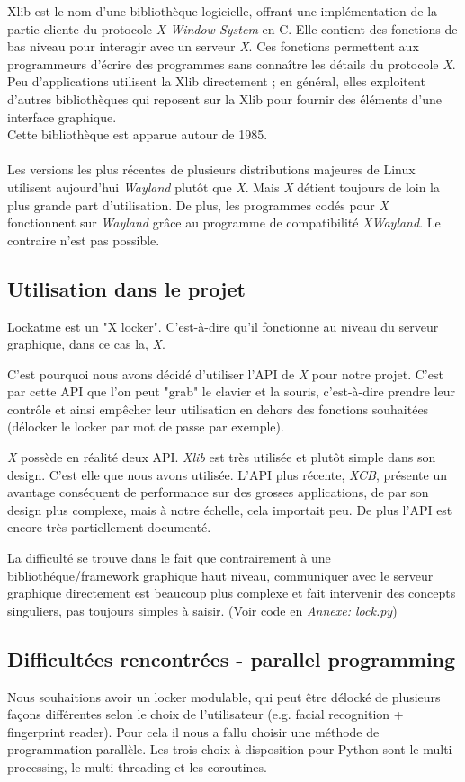 \documentclass[french]{report}
\begin{document}
Xlib est le nom d'une bibliothèque logicielle, offrant une implémentation de la
partie cliente du protocole \emph{X Window System} en C. Elle contient des fonctions
de bas niveau pour interagir avec un serveur \emph{X}. Ces fonctions permettent aux
programmeurs d'écrire des programmes sans connaître les détails du protocole \emph{X}.
Peu d'applications utilisent la Xlib directement ; en général, elles exploitent
d'autres bibliothèques qui reposent sur la Xlib pour fournir des éléments
d'une interface graphique.\\
Cette bibliothèque est apparue autour de 1985.\\\\
Les versions les plus récentes de plusieurs distributions majeures de Linux utilisent
aujourd'hui \emph{Wayland} plutôt que \emph{X}. Mais \emph{X} détient toujours de loin la plus
grande part d'utilisation. De plus, les programmes codés pour \emph{X} fonctionnent
sur \emph{Wayland} grâce au programme de compatibilité \emph{XWayland}. Le contraire n'est pas
possible.

\subsection{Utilisation dans le projet}

Lockatme est un "X locker". C'est-à-dire qu'il fonctionne au niveau du serveur graphique,
dans ce cas la, \emph{X}.

C'est pourquoi nous avons décidé d'utiliser l'API de \emph{X} pour notre projet. C'est par
cette API que l'on peut "grab" le clavier et la souris, c'est-à-dire prendre leur contrôle
et ainsi empêcher leur utilisation en dehors des fonctions souhaitées (délocker le
locker par mot de passe par exemple).

\emph{X} possède en réalité deux API. \emph{Xlib} est très utilisée et plutôt
simple dans son design.
C'est elle que nous avons utilisée. L'API plus récente, \emph{XCB}, présente un
avantage conséquent de performance sur des grosses applications, de par son design
plus complexe, mais à notre échelle, cela importait peu. De plus l'API est encore
très partiellement documenté.

La difficulté se trouve dans le fait que contrairement à une bibliothéque/framework
graphique haut niveau, communiquer avec le serveur graphique directement est
beaucoup plus complexe et fait intervenir des concepts singuliers, pas toujours
simples à saisir. (Voir code en \emph{Annexe: lock.py})

\subsection{Difficultées rencontrées - parallel programming}
Nous souhaitions avoir un locker modulable, qui peut être délocké de plusieurs
façons différentes selon le choix de l'utilisateur (e.g. facial recognition
+ fingerprint reader). Pour cela il nous a fallu choisir une méthode de programmation
parallèle. Les trois choix à disposition pour Python sont le multi-processing,
le multi-threading et les coroutines.
\end{document}
